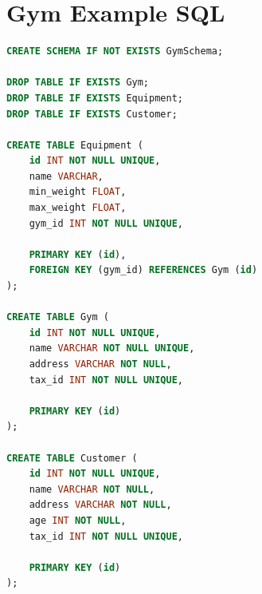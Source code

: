 \documentclass[10pt]{article}
\begin{document}
\newpage



\newpage
\appendix 

\section{Gym Example SQL} \label{Annex1}

\begin{lstlisting}[language=SQL]
CREATE SCHEMA IF NOT EXISTS GymSchema;

DROP TABLE IF EXISTS Gym;
DROP TABLE IF EXISTS Equipment;
DROP TABLE IF EXISTS Customer;

CREATE TABLE Equipment (
	id INT NOT NULL UNIQUE,
	name VARCHAR,
	min_weight FLOAT,
	max_weight FLOAT,
	gym_id INT NOT NULL UNIQUE,
	
	PRIMARY KEY (id),
	FOREIGN KEY (gym_id) REFERENCES Gym (id)
);

CREATE TABLE Gym (
	id INT NOT NULL UNIQUE,
	name VARCHAR NOT NULL UNIQUE,
	address VARCHAR NOT NULL,
	tax_id INT NOT NULL UNIQUE,
	
	PRIMARY KEY (id)
);

CREATE TABLE Customer (
	id INT NOT NULL UNIQUE,
	name VARCHAR NOT NULL,
	address VARCHAR NOT NULL,
	age INT NOT NULL,
	tax_id INT NOT NULL UNIQUE,
	
	PRIMARY KEY (id)
);
\end{lstlisting}
\end{document}
